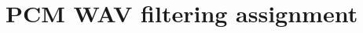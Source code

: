 \documentclass[12pt,letterpaper,openany]{book}
\begin{document}
\setcounter{chapter}{30}
\chapter{PCM WAV filtering assignment}

\end{document}
